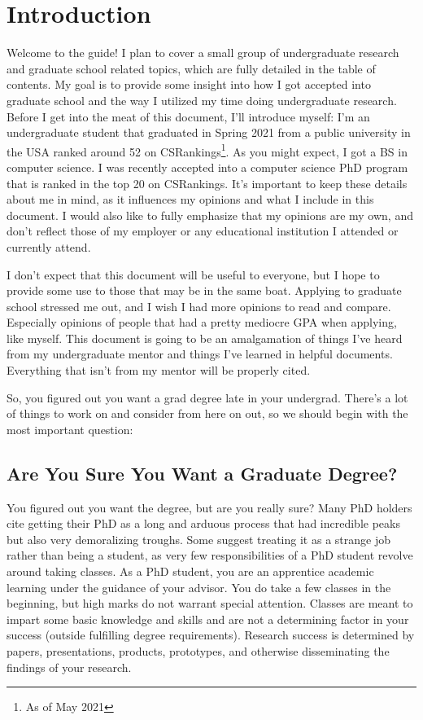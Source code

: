 \documentclass[12pt]{article}
\begin{document}


\tableofcontents
\pagebreak

\section{Introduction}

Welcome to the guide! I plan to cover a small group of undergraduate research and graduate school related topics, which are fully detailed in the table of contents. My goal is to provide some insight into how I got accepted into graduate school and the way I utilized my time doing undergraduate research. Before I get into the meat of this document, I’ll introduce myself: I’m an undergraduate student that graduated in Spring 2021 from a public university in the USA ranked around 52 on CSRankings\footnote{As of May 2021}. As you might expect, I got a BS in computer science. I was recently accepted into a computer science PhD program that is ranked in the top 20 on CSRankings. It’s important to keep these details about me in mind, as it influences my opinions and what I include in this document. I would also like to fully emphasize that my opinions are my own, and don’t reflect those of my employer or any educational institution I attended or currently attend. 

I don’t expect that this document will be useful to everyone, but I hope to provide some use to those that may be in the same boat. Applying to graduate school stressed me out, and I wish I had more opinions to read and compare. Especially opinions of people that had a pretty mediocre GPA when applying, like myself. This document is going to be an amalgamation of things I've heard from my undergraduate mentor and things I've learned in helpful documents. Everything that isn't from my mentor will be properly cited.

So, you figured out you want a grad degree late in your undergrad. There’s a lot of things to work on and consider from here on out, so we should begin with the most important question:

\subsection{Are You Sure You Want a Graduate Degree?}

You figured out you want the degree, but are you really sure? Many PhD holders cite getting their PhD as a long and arduous process that had incredible peaks but also very demoralizing troughs. Some suggest treating it as a strange job rather than being a student, as very few responsibilities of a PhD student revolve around taking classes. \cite{AzumaPhD} As a PhD student, you are an apprentice academic learning under the guidance of your advisor. You do take a few classes in the beginning, but high marks do not warrant special attention. Classes are meant to impart some basic knowledge and skills and are not a determining factor in your success (outside fulfilling degree requirements). Research success is determined by papers, presentations, products, prototypes, and otherwise disseminating the findings of your research.
\end{document}
